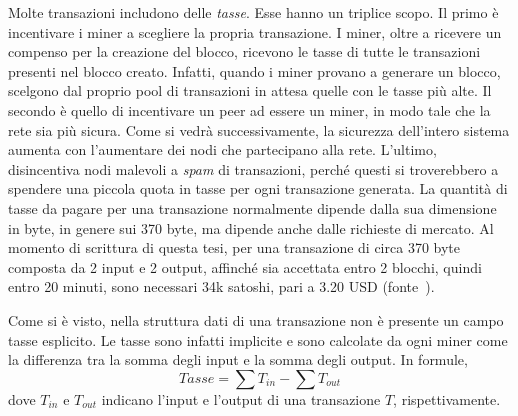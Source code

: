 Molte transazioni includono delle \emph{tasse}. Esse hanno un triplice scopo. Il primo è incentivare i miner a scegliere la propria transazione. I miner, oltre a ricevere un compenso per la creazione del blocco, ricevono le tasse di tutte le transazioni presenti nel blocco creato. Infatti, quando i miner provano a generare un blocco, scelgono dal proprio pool di transazioni in attesa quelle con le tasse più alte. Il secondo è quello di incentivare un peer ad essere un miner, in modo tale che la rete sia più sicura. Come si vedrà successivamente, la sicurezza dell'intero sistema aumenta con l'aumentare dei nodi che partecipano alla rete. L'ultimo, disincentiva nodi malevoli a \emph{spam} di transazioni, perché questi si troverebbero a spendere una piccola quota in tasse per ogni transazione generata. La quantità di tasse da pagare per una transazione normalmente dipende dalla sua dimensione in byte, in genere sui 370 byte, ma dipende anche dalle richieste di mercato. Al momento di scrittura di questa tesi, per una transazione di circa 370 byte composta da 2 input e 2 output, affinché sia accettata entro 2 blocchi, quindi entro 20 minuti, sono necessari 34k satoshi, pari a 3.20 USD (fonte~\cite{bitcoin_fee_calculator}).

Come si è visto, nella struttura dati di una transazione non è presente un campo tasse esplicito. Le tasse sono infatti implicite e sono calcolate da ogni miner come la differenza tra la somma degli input e la somma degli output. In formule,
\begin{equation*}
	Tasse = \sum T_{in} - \sum T_{out}
\end{equation*}
dove $T_{in}$ e $T_{out}$ indicano l'input e l'output di una transazione $T$, rispettivamente.

